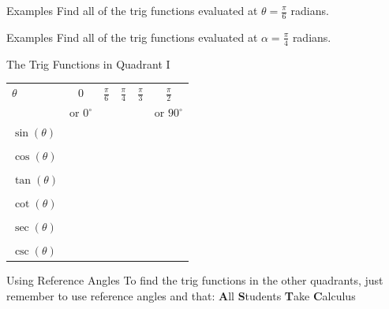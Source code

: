 \documentclass[presentation]{beamer}
\begin{document}
\begin{frame}[label={sec:org298691e}]{Examples}
Find all of the trig functions evaluated at \(\theta = \frac{\pi}{6}\) radians.

\vspace{10in}
\end{frame}
\begin{frame}[label={sec:orgd7a1878}]{Examples}
Find all of the trig functions evaluated at \(\alpha = \frac{\pi}{4}\) radians.

\vspace{10in}
\end{frame}
\begin{frame}[label={sec:orgcb673ef}]{The Trig Functions in Quadrant I}
\begin{center}
\begin{tabular}{|l|ccccc|}
\hline
\(\theta\) & \(0\) & \(\frac{\pi}{6}\) & \(\frac{\pi}{4}\) & \(\frac{\pi}{3}\) & \(\frac{\pi}{2}\)\\[0pt]
 & or \(0^{\circ}\) &  &  &  & or \(90^{\circ}\)\\[0pt]
\hline
\(\sin(\theta)\) & \hspace{0.3in} & \hspace{0.3in} & \hspace{0.3in} & \hspace{0.3in} & \hspace{0.3in}\\[0pt]
 &  &  &  &  & \\[0pt]
\(\cos(\theta)\) &  &  &  &  & \\[0pt]
 &  &  &  &  & \\[0pt]
\(\tan(\theta)\) &  &  &  &  & \\[0pt]
 &  &  &  &  & \\[0pt]
\(\cot(\theta)\) &  &  &  &  & \\[0pt]
 &  &  &  &  & \\[0pt]
\(\sec(\theta)\) &  &  &  &  & \\[0pt]
 &  &  &  &  & \\[0pt]
\(\csc(\theta)\) &  &  &  &  & \\[0pt]
\hline
\end{tabular}
\end{center}
\end{frame}


\begin{frame}[label={sec:orge180022}]{Using Reference Angles}
To find the trig functions in the other quadrants, just remember to use reference angles
and that:
\textbf{A}ll \textbf{S}tudents \textbf{T}ake \textbf{C}alculus

\end{frame}
\end{document}
